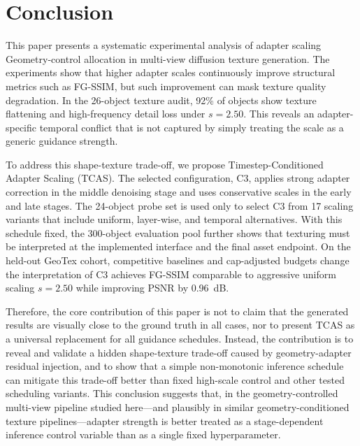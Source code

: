 \documentclass[times,twocolumn,final]{elsarticle}
\providecommand{\DIFadd}[1]{{\protect\color{blue} \sf #1}} %
\providecommand{\DIFdel}[1]{{\protect\color{red} \scriptsize #1}} %
\providecommand{\DIFaddbegin}{} %
\providecommand{\DIFaddend}{} %
\providecommand{\DIFdelbegin}{} %
\providecommand{\DIFdelend}{} %
\begin{document}
\section{Conclusion}
\label{sec:conclusion}

\DIFdelbegin \DIFdel{This paper presents a systematic experimental analysis of adapter scaling }\DIFdelend \DIFaddbegin \DIFadd{Geometry-control allocation }\DIFaddend in multi-view \DIFdelbegin \DIFdel{diffusion texture generation. The experiments show that higher adapter scales continuously improve structural metrics such as FG-SSIM, but such improvement can mask texture quality degradation. In the 26-object texture audit, 92\% of objects show texture flattening and high-frequency detail loss under $s = 2.50$. This reveals an adapter-specific temporal conflict that is not captured by simply treating the scale as a generic guidance strength. }%

\DIFdel{To address this shape-texture trade-off, we propose Timestep-Conditioned Adapter Scaling (TCAS). The selected configuration, C3, applies strong adapter correction in the middle denoising stage and uses conservative scales in the early and late stages. The 24-object probe set is used only to select C3 from 17 scaling variants that include uniform, layer-wise, and temporal alternatives. With this schedule fixed, the 300-object evaluation pool further shows that }\DIFdelend \DIFaddbegin \DIFadd{texturing must be interpreted at the implemented interface and the final asset endpoint. On the held-out GeoTex cohort, competitive baselines and cap-adjusted budgets change the interpretation of }\DIFaddend C3\DIFdelbegin \DIFdel{achieves FG-SSIM comparable to aggressive uniform scaling $s = 2.50$ while improving PSNR by 0.96~dB. }%

\DIFdel{Therefore, the core contribution of this paper is not to claim that the generated results are visually close to the ground truth in all cases, nor to present TCAS as a universal replacement for all guidance schedules.
Instead, the contribution is to reveal and validate a hidden shape-texture trade-off caused by geometry-adapter residual injection, and to show that a simple non-monotonic inference schedule can mitigate this trade-off better than fixed high-scale control and other tested scheduling variants. This conclusion suggests that, in the geometry-controlled multi-view pipeline studied here---and plausibly in similar geometry-conditioned texture pipelines---adapter strength is better treated as a stage-dependent inference control variable than as a single fixed hyperparameter. }%
\end{document}
